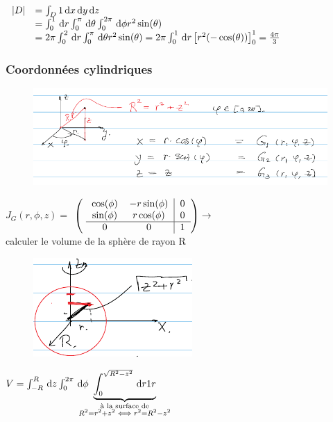\documentclass[12pt,a4paper]{article}
\begin{document}
$\begin{array}{ll}
	|D| &= \int_D 1 \, \mathrm d x\, \mathrm d y\, \mathrm d z\\
		&= \int_0^1 \, \mathrm d r \int_0^\pi \, \mathrm d \theta \int_0^{2\pi} \, \mathrm d \phi r^2 \sin(\theta)\\
		&= 2\pi \int_0^2 \, \mathrm d r \int_0^\pi \, \mathrm d \theta r^2\sin(\theta) = 2\pi \int_0^1 \, \mathrm d r \left[r^2(-\cos(\theta))\right]_0^1 = \frac{4\pi}{3}
\end{array}$

\subsubsection{Coordonnées cylindriques}
\begin{figure}[!h]
	\centering
	\includegraphics[scale=0.7]{images/coord_cylind}
\end{figure}
$J_G (r,\phi,z) =$
$\left(\text{
	\begin{tabular}{cc|c}
		$\cos(\phi)$ & $-r\sin(\phi)$ & 0\\
		$\sin(\phi)$ & $r\cos(\phi)$ & 0\\
		\hline
		0 & 0 & 1
	\end{tabular}}
\right) \to$  \\
 calculer le volume de la sphère de rayon R\\
\begin{figure}
	\includegraphics[scale=0.7]{images/volume_sphere_R}
\end{figure}
$V = \int_{-R}^R \, \mathrm d z\int_0^{2\pi} \, \mathrm d \phi$ \textcolor{red}{$\underbrace{\int_{0}^{\sqrt{R^2-z^2}} \deriv{r} 1 r}_{\mathclap{\substack{\text{à la surface de} \\ R^2 = r^2+z^2 \iff r^2=R^2-z^2}}}$}\\
\end{document}
